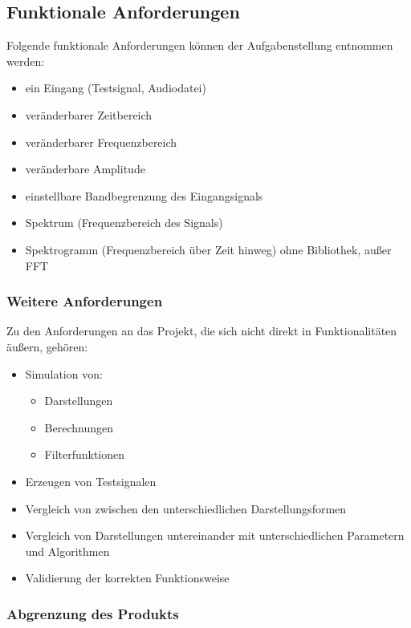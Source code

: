 \documentclass[a4paper]{article}
\begin{document}
\subsection{Funktionale Anforderungen}\label{subsec:funktionaleAnforderungen}

Folgende funktionale Anforderungen können der Aufgabenstellung entnommen werden:
\begin{itemize}
  \item ein Eingang (Testsignal, Audiodatei)
  \item veränderbarer Zeitbereich
  \item veränderbarer Frequenzbereich
  \item veränderbare Amplitude
  \item einstellbare Bandbegrenzung des Eingangsignals
  \item Spektrum (Frequenzbereich des Signals)
  \item Spektrogramm (Frequenzbereich über Zeit hinweg) ohne Bibliothek, außer FFT
\end{itemize}

\subsubsection{Weitere Anforderungen}

Zu den Anforderungen an das Projekt, die sich nicht direkt in Funktionalitäten äußern, gehören:
\begin{itemize}
  \item Simulation von:
  \begin{itemize}
    \item Darstellungen
    \item Berechnungen
    \item Filterfunktionen
  \end{itemize}
  \item Erzeugen von Testsignalen
  \item Vergleich von zwischen den unterschiedlichen Darstellungsformen
  \item Vergleich von Darstellungen untereinander mit unterschiedlichen Parametern und Algorithmen
  \item Validierung der korrekten Funktionsweise
\end{itemize}

\subsubsection{Abgrenzung des Produkts}
\end{document}
